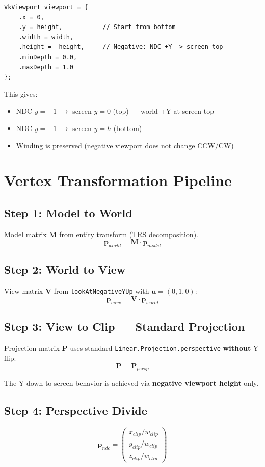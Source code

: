 \documentclass{article}
\begin{document}
\begin{verbatim}
VkViewport viewport = {
    .x = 0,
    .y = height,           // Start from bottom
    .width = width,
    .height = -height,     // Negative: NDC +Y -> screen top
    .minDepth = 0.0,
    .maxDepth = 1.0
};
\end{verbatim}

This gives:
\begin{itemize}
\item NDC $y = +1$ $\to$ screen $y = 0$ (top) --- world +Y at screen top \checkmark
\item NDC $y = -1$ $\to$ screen $y = h$ (bottom)
\item Winding is preserved (negative viewport does not change CCW/CW)
\end{itemize}

\section{Vertex Transformation Pipeline}

\subsection{Step 1: Model to World}
Model matrix $\mathbf{M}$ from entity transform (TRS decomposition).
\[
\mathbf{p}_{world} = \mathbf{M} \cdot \mathbf{p}_{model}
\]

\subsection{Step 2: World to View}
View matrix $\mathbf{V}$ from \texttt{lookAtNegativeYUp} with $\mathbf{u} = (0,1,0)$:
\[
\mathbf{p}_{view} = \mathbf{V} \cdot \mathbf{p}_{world}
\]

\subsection{Step 3: View to Clip --- Standard Projection}
Projection matrix $\mathbf{P}$ uses standard \texttt{Linear.Projection.perspective} \textbf{without} Y-flip:
\[
\mathbf{P} = \mathbf{P}_{persp}
\]

The Y-down-to-screen behavior is achieved via \textbf{negative viewport height} only.

\subsection{Step 4: Perspective Divide}
\[
\mathbf{p}_{ndc} = \begin{pmatrix} x_{clip}/w_{clip} \\ y_{clip}/w_{clip} \\ z_{clip}/w_{clip} \end{pmatrix}
\]
\end{document}
